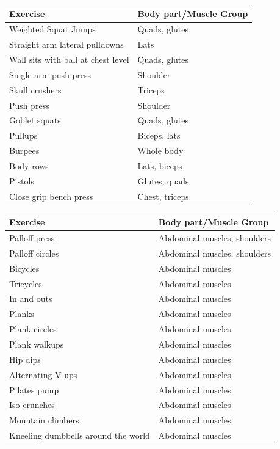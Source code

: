 \documentclass[
  oneside]{book}
\begin{document}
\captionsetup[table]{labelformat=empty,skip=1pt}
\begin{longtable}{ll}
\toprule
\textbf{Exercise} & \textbf{Body part/Muscle Group} \\ 
\midrule
Weighted Squat Jumps & Quads, glutes \\ 
Straight arm lateral pulldowns & Lats \\ 
Wall sits with ball at chest level & Quads, glutes \\ 
Single arm push press & Shoulder \\ 
Skull crushers & Triceps \\ 
Push press & Shoulder \\ 
Goblet squats & Quads, glutes \\ 
Pullups & Biceps, lats \\ 
Burpees & Whole body \\ 
Body rows & Lats, biceps \\ 
Pistols & Glutes, quads \\ 
Close grip bench press & Chest, triceps \\ 
 \bottomrule
\end{longtable}

\captionsetup[table]{labelformat=empty,skip=1pt}
\begin{longtable}{ll}
\toprule
\textbf{Exercise} & \textbf{Body part/Muscle Group} \\ 
\midrule
Palloff press & Abdominal muscles, shoulders \\ 
Palloff circles & Abdominal muscles, shoulders \\ 
Bicycles & Abdominal muscles \\ 
Tricycles & Abdominal muscles \\ 
In and outs & Abdominal muscles \\ 
Planks & Abdominal muscles \\ 
Plank circles & Abdominal muscles \\ 
Plank walkups & Abdominal muscles \\ 
Hip dips & Abdominal muscles \\ 
Alternating V-ups & Abdominal muscles \\ 
Pilates pump & Abdominal muscles \\ 
Iso crunches & Abdominal muscles \\ 
Mountain climbers & Abdominal muscles \\ 
Kneeling dumbbells around the world & Abdominal muscles \\ 
 \bottomrule
\end{longtable}
\end{document}
